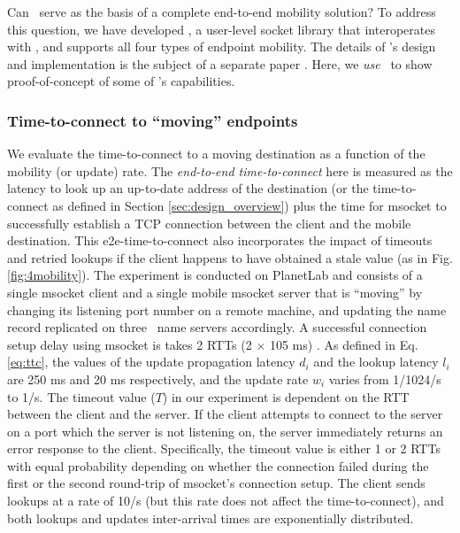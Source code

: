 Can \auspice\ serve as the basis of a complete end-to-end mobility solution? To address this question, we have developed \msocket, a user-level socket library that interoperates with \auspice, and supports all four types of endpoint mobility. %
The details of \msocket's design and implementation is the subject of a separate paper \cite{msocketTR}. Here, we {\em use} \msocket\ to show proof-of-concept of some of \auspice's capabilities.

\subsubsection{Time-to-connect to ``moving'' endpoints}
\label{sec:ttc_exp}

We evaluate the time-to-connect to a moving destination as a function of the mobility (or update) rate. The {\em end-to-end time-to-connect}  here is measured as the latency to look up an up-to-date address of the destination (or the time-to-connect as defined in Section \ref{sec:design_overview}) plus the time for msocket to successfully establish a TCP connection between the client and the mobile destination. This e2e-time-to-connect also incorporates the impact of timeouts and retried lookups if the client happens to have obtained a stale value (as in Fig. \ref{fig:4mobility}). The experiment is conducted on PlanetLab and consists of a single msocket client and a single mobile msocket server that is ``moving'' by changing its listening port number on a remote machine, and updating the name record replicated on three \auspice\ name servers accordingly. 
A successful connection setup delay using msocket is takes 2 RTTs (2 $\times$ 105 ms)  \cite{msocketTR}. 
As defined in Eq. \ref{eq:ttc}, the values of the update propagation latency $d_i$ and the lookup latency $l_i$ are 250 ms and 20 ms respectively, and the update rate $w_i$ varies from 1/1024/s to 1/s.
The timeout value ($T$) in our experiment is dependent on the RTT between the client and the server. If the client attempts to connect to the server on a port which the server is not listening on, the server immediately returns an error response to the client. Specifically, the timeout value is either 1 or 2 RTTs with equal probability depending on whether the connection failed during the first or the second round-trip of msocket's connection setup.
The client sends lookups at a rate of 10/s (but this rate does not affect the time-to-connect), and both lookups and updates inter-arrival times are exponentially distributed.


